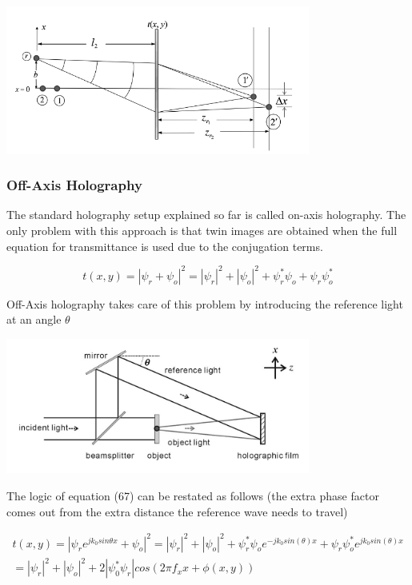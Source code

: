 \documentclass[12pt]{article}
\begin{document}
\begin{center}
\includegraphics[width=100mm]{tupac13.png}
\end{center}

\subsubsection{Off-Axis Holography}

The standard holography setup explained so far is called on-axis holography. The only problem with this approach is that twin images are obtained when the full equation for transmittance is used due to the conjugation terms.

\begin{equation}
	t(x,y) = |\psi_{r} + \psi_{o}|^2 = |\psi_{r}|^2 + |\psi_{o}|^2
	 + \psi_{r}^*\psi_{o} + \psi_{r}\psi_{o}^*
\end{equation}

Off-Axis holography takes care of this problem by introducing the reference
light at an angle \(\theta\)

\begin{center}
\includegraphics[width=100mm]{tupac9.png}
\end{center}

The logic of equation (67) can be restated as follows (the extra phase factor comes out from the extra distance the reference wave needs to travel)

\begin{equation}
	\begin{multlined}
	t(x,y) = |\psi_{r}e^{jk_{0}sin\theta x} + \psi_{o}|^2 = |\psi_{r}|^2 + |\psi_{o}|^2
         + \psi_{r}^*\psi_{o}e^{-jk_{0}sin(\theta) x} + \psi_{r}\psi_{o}^*e^{jk_{0}sin(\theta)x}
	\\=|\psi_{r}|^2 + |\psi_{o}|^2 + 2|\psi_{0}^*\psi_{r}|cos(2\pi f_{x}x + \phi (x,y))
	\end{multlined}
\end{equation}
\end{document}
